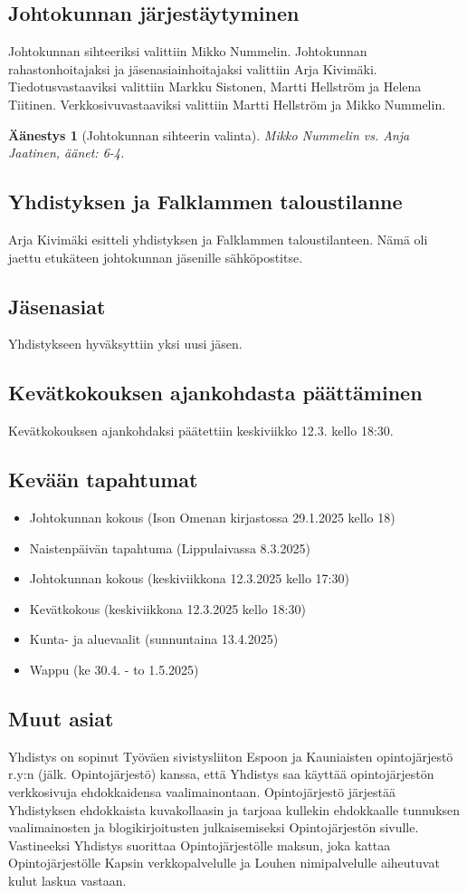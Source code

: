 \documentclass[a4paper,12pt]{article}
\newtheorem{aanestys}{Äänestys}
\begin{document}
\subsection{Johtokunnan järjestäytyminen}
Johtokunnan sihteeriksi valittiin Mikko Nummelin. Johtokunnan rahastonhoitajaksi ja jäsenasiainhoitajaksi valittiin Arja Kivimäki. Tiedotusvastaaviksi valittiin Markku Sistonen, Martti Hellström ja Helena Tiitinen. Verkkosivuvastaaviksi valittiin Martti Hellström ja Mikko Nummelin.
\begin{aanestys}[Johtokunnan sihteerin valinta]
  Mikko Nummelin vs. Anja Jaatinen, äänet: 6-4.
\end{aanestys}
\subsection{Yhdistyksen ja Falklammen taloustilanne}
Arja Kivimäki esitteli yhdistyksen ja Falklammen taloustilanteen. Nämä oli jaettu etukäteen johtokunnan jäsenille sähköpostitse.
\subsection{Jäsenasiat}
Yhdistykseen hyväksyttiin yksi uusi jäsen.
\subsection{Kevätkokouksen ajankohdasta päättäminen}
Kevätkokouksen ajankohdaksi päätettiin keskiviikko 12.3. kello 18:30.
\subsection{Kevään tapahtumat}
\begin{itemize}
\item{Johtokunnan kokous} (Ison Omenan kirjastossa 29.1.2025 kello 18)
\item{Naistenpäivän tapahtuma} (Lippulaivassa 8.3.2025)
\item{Johtokunnan kokous} (keskiviikkona 12.3.2025 kello 17:30)
\item{Kevätkokous} (keskiviikkona 12.3.2025 kello 18:30)
\item{Kunta- ja aluevaalit} (sunnuntaina 13.4.2025)
\item{Wappu} (ke 30.4. - to 1.5.2025)
\end{itemize}
\subsection{Muut asiat}
Yhdistys on sopinut Työväen sivistysliiton Espoon ja Kauniaisten opintojärjestö r.y:n (jälk. Opintojärjestö) kanssa, että Yhdistys saa käyttää opintojärjestön verkkosivuja ehdokkaidensa vaalimainontaan. Opintojärjestö järjestää Yhdistyksen ehdokkaista kuvakollaasin ja tarjoaa kullekin ehdokkaalle tunnuksen vaalimainosten ja blogikirjoitusten julkaisemiseksi Opintojärjestön sivulle. Vastineeksi Yhdistys suorittaa Opintojärjestölle maksun, joka kattaa Opintojärjestölle Kapsin verkkopalvelulle ja Louhen nimipalvelulle aiheutuvat kulut laskua vastaan.
\end{document}
